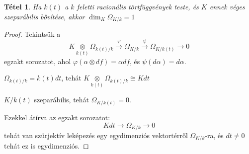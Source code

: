 \documentclass[11pt]{article}
\newtheorem*{theorem}{Tétel}
\theoremstyle{definition}
\begin{document}
\begin{theorem} Ha $k(t)$ a $k$ feletti racionális törtfüggvények teste, és $K$ ennek véges szeparábilis bővítése, akkor $\dim_K\Omega_{K/k}=1$
\end{theorem}

\begin{proof} Tekintsük a
$$K\underset{k(t)}\otimes\Omega_{k(t)/k}\overset{\varphi}\rightarrow\Omega_{K/k}\overset{\psi}\rightarrow\Omega_{K/k(t)}\rightarrow 0$$
egzakt sorozatot, ahol $\varphi(\alpha\otimes df)= \alpha df$, és $\psi(d\alpha)= d\alpha$.

$\Omega_{k(t)/k}=k(t)dt$, tehát $K\underset{k(t)}\otimes\Omega_{k(t)/k}\cong Kdt$

$K/k(t)$ szeparábilis, tehát $\Omega_{K/k(t)}=0$.

Ezekkel átírva az egzakt sorozatot:
$$Kdt\rightarrow \Omega_{K/k}\rightarrow 0$$
tehát van szürjektív leképezés egy egydimenziós vektortérről $\Omega_{K/k}$-ra, és $dt\neq0$ tehát ez is egydimenziós.
\end{proof}
\end{document}
